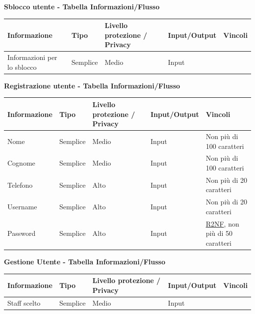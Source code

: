 \documentclass[a4paper]{article}
\begin{document}
\textbf{Sblocco utente  - Tabella Informazioni/Flusso}

\begin{center}
    \begin{tabularx}{1\textwidth}{|X|X|X|X|X|}
        \hline
        \textbf{Informazione} &\textbf{Tipo} & \textbf{Livello protezione / Privacy} & \textbf{Input/Output} & \textbf{Vincoli}\\
        \hline
        \hline
        Informazioni per lo sblocco & Semplice & Medio & Input & \\
        \hline
    \end{tabularx}
\end{center}

\textbf{Registrazione utente  - Tabella Informazioni/Flusso}

\begin{center}
    \begin{tabularx}{1\textwidth}{|X|X|X|X|X|}
        \hline
        \textbf{Informazione} &\textbf{Tipo} & \textbf{Livello protezione / Privacy} & \textbf{Input/Output} & \textbf{Vincoli}\\
        \hline
        \hline
        Nome & Semplice & Medio & Input & Non più di 100 caratteri\\
        \hline
        Cognome & Semplice & Medio & Input & Non più di 100 caratteri\\
        \hline
        Telefono & Semplice & Alto & Input & Non più di 20 caratteri\\
        \hline
        Username & Semplice & Alto & Input & Non più di 20 caratteri\\
        \hline
        Password & Semplice & Alto & Input & \hyperlink{R2NF}{R2NF}, non più di 50 caratteri\\
        \hline
    \end{tabularx}
\end{center}

\newpage

\textbf{Gestione Utente - Tabella Informazioni/Flusso}

\begin{center}
    \begin{tabularx}{1\textwidth}{|X|X|X|X|X|}
        \hline
        \textbf{Informazione} &\textbf{Tipo} & \textbf{Livello protezione / Privacy} & \textbf{Input/Output} & \textbf{Vincoli}\\
        \hline
        \hline
        Staff scelto & Semplice & Medio & Input & \\
        \hline
    \end{tabularx}
\end{center}
\end{document}
